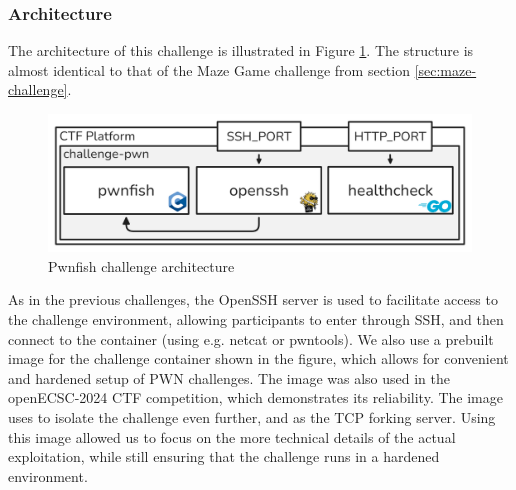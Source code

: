 

\subsubsection{Architecture}
The architecture of this challenge is illustrated in Figure \ref{fig:pwnfish-architecture}. The structure is almost identical to that of the Maze Game challenge from section \ref{sec:maze-challenge}.
\begin{figure}[H]
    \centering
    \includegraphics[width=0.85\linewidth]{img/challenge-pwn--architecture.png}
    \caption{Pwnfish challenge architecture}
    \label{fig:pwnfish-architecture}
\end{figure}
\noindent
As in the previous challenges, the OpenSSH server is used to facilitate access to the challenge environment, allowing participants to enter through SSH, and then connect to the  container (using e.g. netcat or pwntools). 
We also use a prebuilt image \cite{challenge-jail} for the  challenge container shown in the figure, which allows for convenient and hardened setup of PWN challenges. The image was also used in the openECSC-2024 CTF competition\cite{openECSC}, which demonstrates its reliability. The image uses \cite{nsjail} to isolate the challenge even further, and \cite{socaz} as the TCP forking server. Using this image allowed us to focus on the more technical details of the actual exploitation, while still ensuring that the challenge runs in a hardened environment.

